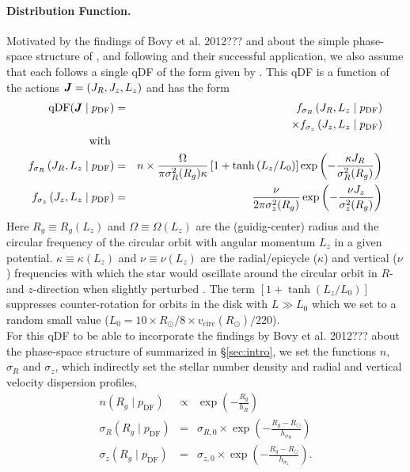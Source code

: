 \paragraph{Distribution Function.} Motivated by the findings of Bovy et al. 2012??? and \citet{tin13} about the simple phase-space structure of \MAPs, and following \citet{bov13} and their successful application, we also assume that each \MAP follows a single qDF of the form given by \citet{bin11}.  This qDF  is a function of the actions $\boldsymbol{J}=(J_R,J_z,L_z)$ and has the form
\begin{eqnarray}
\text{qDF}(\boldsymbol{J} \mid p_\text{DF}) &=& f_{\sigma_R}\left(J_R,L_z \mid p_\text{DF}\right) \nonumber\\
&& \times f_{\sigma_z}\left(J_z,L_z \mid p_\text{DF}\right)\label{eq:df_general}\\
\text{with }&&\\
f_{\sigma_R}\left(J_R,L_z \mid p_\text{DF}\right) &=& n \times \frac{\Omega}{\pi\sigma_R^2(R_g) \kappa}\left[1+\tanh\left(L_z/L_0\right) \right]\exp\left(-\frac{\kappa J_R}{\sigma_R^2(R_g)} \right) \\
f_{\sigma_z}\left(J_z,L_z \mid p_\text{DF} \right) &=& \frac{\nu}{2 \pi \sigma_z^2(R_g)} \exp\left( -\frac{\nu J_z}{\sigma_z^2(R_g)} \right) \\
\end{eqnarray}
Here $R_g \equiv R_g(L_z)$ and $\Omega\equiv \Omega(L_z)$ are the (guidig-center) radius and the circular frequency of the circular orbit with angular momentum $L_z$ in a given potential. $\kappa\equiv \kappa(L_z)$ and $\nu\equiv \nu(L_z)$ are the radial/epicycle ($\kappa$) and vertical ($\nu$) frequencies with which the star would oscillate around the circular orbit in $R$- and $z$-direction when slightly perturbed \citep{bin08}. The term $\left[1+\tanh\left(L_z/L_0\right) \right]$ suppresses counter-rotation for orbits in the disk with $L \gg L_0$ which we set to a random small value ($L_0 = 10 \times R_\odot/8 \times v_\text{circ}(R_\odot)/220$).
\\For this qDF to be able to incorporate the findings by Bovy et al. 2012??? about the phase-space structure of \MAPs summarized in \S\ref{sec:intro}, we set the functions $n$,  $\sigma_R$ and $\sigma_z$, which indirectly set the stellar number density and radial and vertical velocity dispersion profiles,
\begin{eqnarray}
n(R_g \mid p_\text{DF}) &\propto& \exp\left(-\frac{R_g}{h_R} \right)\\
\sigma_R(R_g \mid p_\text{DF}) &=& \sigma_{R,0} \times \exp\left(- \frac{R_g-R_\odot}{h_{\sigma_R}} \right)\label{eq:sigmaRRg}\\
\sigma_z(R_g \mid p_\text{DF}) &=& \sigma_{z,0} \times \exp\left(- \frac{R_g-R_\odot}{h_{\sigma_z}} \right)\label{eq:sigmazRg}.
\end{eqnarray}
